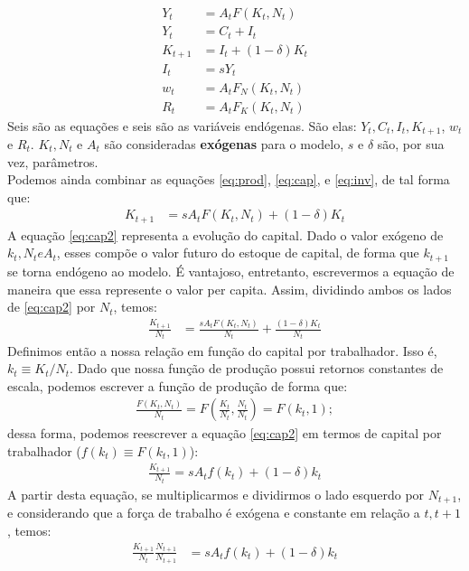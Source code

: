 \documentclass[11pt,a4paper]{article}
\begin{document}
\begin{align}
Y_t &= A_t F(K_t, N_t)\\ \label{eq:prod}
Y_t &= C_t + I_t\\
K_{t+1} &= I_t + (1-\delta)K_t\\ \label{eq:cap}
I_t &= sY_t\\ \label{eq:inv}
w_t &= A_t F_N(K_t, N_t)\\
R_t &= A_t F_K(K_t, N_t)
\end{align}  
Seis são as equações e seis são as variáveis endógenas. São elas: $Y_t, C_t, I_t, K_{t+1}$, $w_t$ e $R_t$. $K_t, N_t$ e $A_t$ são consideradas \textbf{exógenas} para o modelo, $s$ e $\delta$ são, por sua vez, parâmetros.\\

Podemos ainda combinar as equações \ref{eq:prod}, \ref{eq:cap}, e \ref{eq:inv}, de tal forma que:
\begin{align}
K_{t+1} &= s A_t F(K_t, N_t) + (1-\delta)K_t \label{eq:cap2}
\end{align}
\noindent
A equação \ref{eq:cap2} representa a evolução do capital. Dado o valor exógeno de $k_t, N_t e A_t$, esses compõe o valor futuro do estoque de capital, de forma que $k_{t+1}$ se torna endógeno ao modelo. É vantajoso, entretanto, escrevermos a equação de maneira que essa represente o valor per capita. Assim, dividindo ambos os lados de \ref{eq:cap2} por $N_t$, temos:
\begin{align}
\frac{K_{t+1}}{N_t} &= \frac{s A_t F(K_t, N_t)}{N_t} + \frac{(1-\delta)K_t}{N_t}
\end{align} 
Definimos então a nossa relação em função do capital por trabalhador. Isso é, $k_t \equiv K_t / N_t$. Dado que nossa função de produção possui retornos constantes de escala, podemos escrever a função de produção de forma que:
\begin{align}
\frac{F(K_t, N_t)}{N_t} = F\left(\frac{K_t}{N_t},\frac{N_t}{N_t}\right) = F(k_t, 1);
\end{align}
\noindent
dessa forma, podemos reescrever a equação \ref{eq:cap2} em termos de capital por trabalhador ($f(k_t)\equiv F(k_t, 1)$):
\begin{align}
\frac{K_{t+1}}{N_t} = s A_t f(k_t) + (1-\delta)k_t
\end{align}
A partir desta equação, se multiplicarmos e dividirmos o lado esquerdo por $N_{t+1}$, e considerando que a força de trabalho é exógena e constante em relação a $t, t+1$, temos:
\begin{align*}
\frac{K_{t+1}}{N_t}\frac{N_{t+1}}{N_{t+1}} &= s A_t f(k_t) + (1-\delta)k_t \\
\end{align*}
\end{document}

